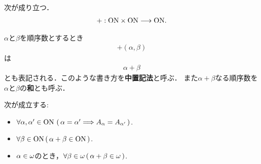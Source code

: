 	\begin{screen}
		\begin{thm}[$+$は写像である]
			次が成り立つ．
			\begin{align}
				+:\mathrm{ON} \times \mathrm{ON} \longrightarrow \mathrm{ON}.
			\end{align}
		\end{thm}
	\end{screen}
	
	\begin{sketch}
		
	\end{sketch}
	
	$\alpha$と$\beta$を順序数とするとき
	\begin{align}
		+(\alpha,\beta)
	\end{align}
	は
	\begin{align}
		\alpha + \beta
	\end{align}
	とも表記される．このような書き方を{\bf 中置記法}と呼ぶ．
	また$\alpha + \beta$なる順序数を$\alpha$と$\beta$の{\bf 和}とも呼ぶ．
	
	\begin{screen}
		\begin{thm}[自然数の和は自然数]\label{thm:the_definition_of_addition_of_ordinal_numbers}
			次が成立する:
			\begin{itemize}
				\item $\forall \alpha,\alpha' \in \mathrm{ON}\, \left(\, \alpha = \alpha' \Longrightarrow A_\alpha = A_{\alpha'}\, \right)$.
				\item $\forall \beta \in \mathrm{ON}\, (\, \alpha + \beta \in \mathrm{ON}\, )$.
				\item $\alpha \in {\bf \omega}$のとき，$\forall \beta \in {\bf \omega}\, (\, \alpha + \beta \in {\bf \omega}\, )$.
			\end{itemize}
		\end{thm}
	\end{screen}
	
